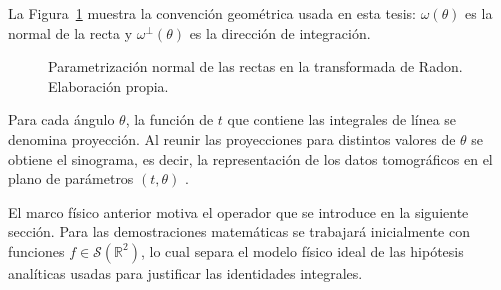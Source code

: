 La Figura~\ref{fig:radon-geometria} muestra la convención geométrica usada en esta tesis: $\omega(\theta)$ es la normal de la recta y $\omega^\perp(\theta)$ es la dirección de integración.

\begin{figure}[htbp]
\centering
\resizebox{0.72\textwidth}{!}{}
\caption{Parametrización normal de las rectas en la transformada de Radon. Elaboración propia.}
\label{fig:radon-geometria}
\end{figure}

Para cada ángulo $\theta$, la función de $t$ que contiene las integrales de línea se denomina proyección. Al reunir las proyecciones para distintos valores de $\theta$ se obtiene el sinograma, es decir, la representación de los datos tomográficos en el plano de parámetros $(t,\theta)$ \cite[Sec.~5.3.5, p.~28]{kuchment2014}.

El marco físico anterior motiva el operador que se introduce en la siguiente sección. Para las demostraciones matemáticas se trabajará inicialmente con funciones $f\in\mathcal S(\mathbb R^2)$, lo cual separa el modelo físico ideal de las hipótesis analíticas usadas para justificar las identidades integrales.

